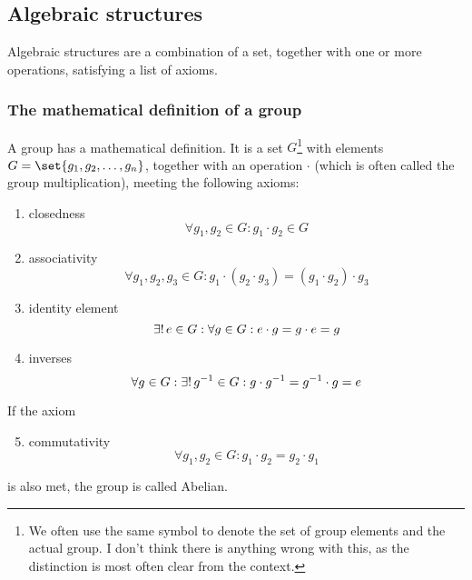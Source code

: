 \subsection{Algebraic structures}
    Algebraic structures are a combination of a set, together with one or more operations, satisfying a list of axioms.

    \subsubsection{The mathematical definition of a group} \label{sec:group_def}
        A group has a mathematical definition. It is a set $G$\footnote{We often use the same symbol to denote the set of group elements and the actual group. I don't think there is anything wrong with this, as the distinction is most often clear from the context.} with elements $G=\set{g_1, g_2, \dots, g_n}$, together with an operation $\cdot$ (which is often called the group multiplication), meeting the following axioms:
        \begin{enumerate}
            \item closedness
            \begin{equation}
                \forall g_1, g_2 \in G: g_1 \cdot g_2 \in G
            \end{equation}

            \item associativity
            \begin{equation}
                \forall g_1, g_2, g_3 \in G: g_1 \cdot (g_2 \cdot g_3) = (g_1 \cdot g_2) \cdot g_3
            \end{equation}

            \item identity element
            \begin{equation} \label{eq:group_id}
                \exists! \thinspace e \in G: \forall g \in G: e \cdot g = g \cdot e = g
            \end{equation}

            \item inverses
            \begin{equation}
                \forall g \in G: \exists! \thinspace g^{-1} \in G: g \cdot g^{-1} = g^{-1} \cdot g = e
            \end{equation}
        \end{enumerate}
        If the axiom
        \begin{enumerate}
            \setcounter{enumi}{4}
            \item commutativity
            \begin{equation}
                \forall g_1, g_2 \in G: g_1 \cdot g_2 = g_2 \cdot g_1
            \end{equation}
        \end{enumerate}
        is also met, the group is called Abelian. \\

